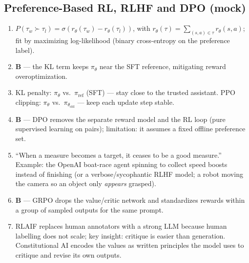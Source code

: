 \documentclass[11pt,oneside]{article}
\begin{document}
\subsection*{Preference-Based RL, RLHF and DPO (mock)}
\begin{enumerate}[label=\textbf{Q\arabic*.}, leftmargin=3em, itemsep=3pt, start=34]
  \item $P(\tau_w\succ\tau_l)=\sigma(r_\theta(\tau_w)-r_\theta(\tau_l))$, with $r_\theta(\tau)=\sum_{(s,a)\in\tau}r_\theta(s,a)$; fit by maximizing log-likelihood (binary cross-entropy on the preference label).
  \item \textbf{B} --- the KL term keeps $\pi_\theta$ near the SFT reference, mitigating reward overoptimization.
  \item KL penalty: $\pi_\theta$ vs.\ $\pi_{\text{ref}}$ (SFT) --- stay close to the trusted assistant. PPO clipping: $\pi_\theta$ vs.\ $\pi_{\theta_{\text{old}}}$ --- keep each update step stable.
  \item \textbf{B} --- DPO removes the separate reward model and the RL loop (pure supervised learning on pairs); limitation: it assumes a fixed offline preference set.
  \item ``When a measure becomes a target, it ceases to be a good measure.'' Example: the OpenAI boat-race agent spinning to collect speed boosts instead of finishing (or a verbose/sycophantic RLHF model; a robot moving the camera so an object only \emph{appears} grasped).
  \item \textbf{B} --- GRPO drops the value/critic network and standardizes rewards within a group of sampled outputs for the same prompt.
  \item RLAIF replaces human annotators with a strong LLM because human labelling does not scale; key insight: critique is easier than generation. Constitutional AI encodes the values as written principles the model uses to critique and revise its own outputs.
\end{enumerate}
\end{document}
